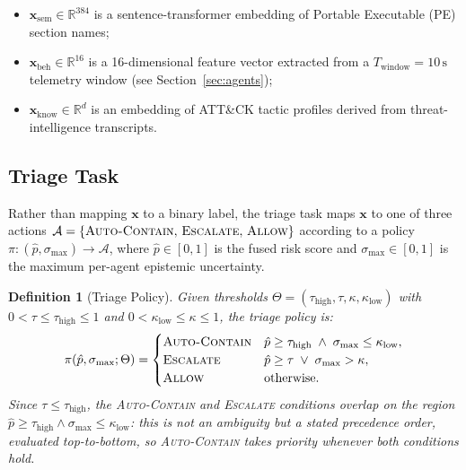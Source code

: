 \documentclass[journal]{IEEEtran}
\newcommand{\R}{\mathbb{R}}
\newtheorem{definition}{Definition}
\begin{document}
\begin{itemize}
  \item $\mathbf{x}_{\text{sem}} \in \R^{384}$ is a sentence-transformer
        embedding of Portable Executable (PE) section names;
  \item $\mathbf{x}_{\text{beh}} \in \R^{16}$ is a 16-dimensional feature
        vector extracted from a $T_{\text{window}}=10\,\text{s}$ telemetry
        window (see Section~\ref{sec:agents});
  \item $\mathbf{x}_{\text{know}} \in \R^{d}$ is an embedding of
        ATT\&CK tactic profiles derived from threat-intelligence transcripts.
\end{itemize}

\subsection{Triage Task}

Rather than mapping $\mathbf{x}$ to a binary label, the triage task maps
$\mathbf{x}$ to one of three actions $\mathcal{A} =
\{\textsc{Auto-Contain},\, \textsc{Escalate},\, \textsc{Allow}\}$ according
to a policy $\pi : (\hat{p}, \sigma_{\max}) \to \mathcal{A}$, where
$\hat{p} \in [0,1]$ is the fused risk score and $\sigma_{\max} \in [0,1]$ is
the maximum per-agent epistemic uncertainty.

\begin{definition}[Triage Policy]\label{def:policy}
Given thresholds $\Theta = (\tau_{\text{high}}, \tau, \kappa,
\kappa_{\text{low}})$ with $0 < \tau \leq \tau_{\text{high}} \leq 1$ and
$0 < \kappa_{\text{low}} \leq \kappa \leq 1$, the triage policy is:
\begin{equation}\label{eq:policy}
  \pi(\hat{p}, \sigma_{\max}; \Theta) =
  \begin{cases}
    \textsc{Auto-Contain} & \hat{p} \geq \tau_{\text{high}}
                            \;\wedge\; \sigma_{\max} \leq \kappa_{\text{low}}, \\
    \textsc{Escalate}     & \hat{p} \geq \tau
                            \;\vee\; \sigma_{\max} > \kappa, \\
    \textsc{Allow}        & \text{otherwise.}
  \end{cases}
\end{equation}
Since $\tau \leq \tau_{\text{high}}$, the \textsc{Auto-Contain} and
\textsc{Escalate} conditions overlap on the region $\hat{p} \geq
\tau_{\text{high}} \wedge \sigma_{\max} \leq \kappa_{\text{low}}$: this is
not an ambiguity but a stated precedence order, evaluated top-to-bottom, so
\textsc{Auto-Contain} takes priority whenever both conditions hold.
\end{definition}
\end{document}
